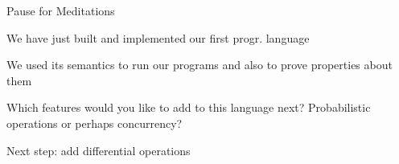 \documentclass{beamer}
\begin{document}
\begin{frame}{Pause for Meditations}

        We have just built and implemented our first progr. language
        
        We used its semantics to \alert{run} our programs and also to
        \alert{prove} properties about them

        Which features would you like to add to this language next? Probabilistic
        operations or perhaps concurrency?
        
        Next step: add \alert{differential operations}
\end{frame}
%
%
%
%
%
%
%
\end{document}
